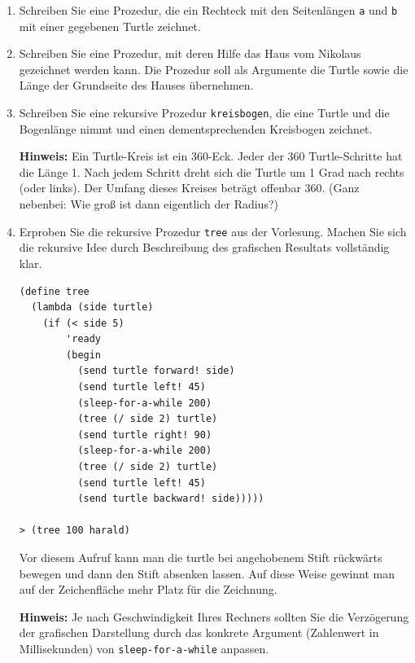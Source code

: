 \documentclass[12pt,a4paper]{scrartcl}
\begin{document}
\begin{enumerate}

\item Schreiben Sie eine Prozedur, die ein Rechteck mit den Seitenl\"{a}ngen
\texttt{a} und \texttt{b} mit einer gegebenen Turtle zeichnet.

\item Schreiben Sie eine Prozedur, mit deren Hilfe das Haus vom Nikolaus gezeichnet werden kann.
Die Prozedur soll als Argumente die Turtle sowie die L\"{a}nge der Grundseite des Hauses \"{u}bernehmen.

\item Schreiben Sie eine rekursive Prozedur \texttt{kreisbogen}, die eine Turtle und
die Bogenl\"{a}nge nimmt und einen dementsprechenden Kreisbogen zeichnet.

\textbf{Hinweis:} Ein Turtle-Kreis ist ein 360-Eck. Jeder der 360
Turtle-Schritte hat die L\"{a}nge 1. Nach jedem Schritt dreht sich die Turtle um 1
Grad nach rechts (oder links). Der Umfang dieses Kreises betr\"{a}gt offenbar 360.
(Ganz nebenbei: Wie gro{\ss} ist dann eigentlich der Radius?)

\newpage

\item Erproben Sie die rekursive Prozedur \texttt{tree} aus der Vorlesung. Machen Sie sich die rekursive Idee durch Beschreibung des grafischen Resultats vollständig klar.
\begin{verbatim}
(define tree
  (lambda (side turtle)
    (if (< side 5) 
        'ready
        (begin
          (send turtle forward! side)
          (send turtle left! 45)
          (sleep-for-a-while 200)
          (tree (/ side 2) turtle)
          (send turtle right! 90)
          (sleep-for-a-while 200)
          (tree (/ side 2) turtle)
          (send turtle left! 45)
          (send turtle backward! side)))))
         
> (tree 100 harald)    
\end{verbatim}

Vor diesem Aufruf kann man die turtle bei angehobenem Stift r\"{u}ckw\"{a}rts bewegen und dann den Stift absenken lassen.
Auf diese Weise gewinnt man auf der Zeichenfläche mehr Platz f\"{u}r die Zeichnung.
%

\textbf{Hinweis:} Je nach Geschwindigkeit Ihres Rechners sollten Sie die Verz\"{o}gerung der grafischen Darstellung durch das konkrete Argument (Zahlenwert in Millisekunden) von \texttt{sleep-for-a-while} anpassen.


\end{enumerate}
\end{document}
